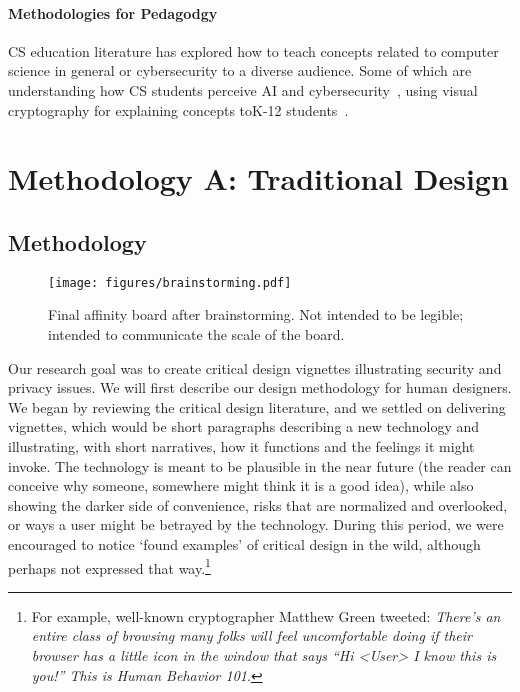 \paragraph{Methodologies for Pedagodgy} 
CS education literature has explored how to teach concepts related to computer science in general or cybersecurity to a diverse audience. Some of which are understanding how CS students perceive AI and cybersecurity~\cite{ojha_computing_2023}, using visual cryptography for explaining concepts toK-12 students~\cite{rayavaram_designing_2023}.



\section{Methodology A: Traditional Design}
\label{sec:meth1}

\subsection{Methodology}

\begin{figure}[t]
\begin{center}
\texttt{[image: figures/brainstorming.pdf]}
\caption{Final affinity board after brainstorming. Not intended to be legible; intended to communicate the scale of the board.\label{fig:board}}
\end{center}
\end{figure}


Our research goal was to create critical design vignettes illustrating security and privacy issues. We will first describe our design methodology for human designers. We began by reviewing the critical design literature, and we settled on delivering vignettes, which would be short paragraphs describing a new technology and illustrating, with short narratives, how it functions and the feelings it might invoke. The technology is meant to be plausible in the near future (the reader can conceive why someone, somewhere might think it is a good idea), while also showing the darker side of convenience, risks that are normalized and overlooked, or ways a user might be betrayed by the technology. During this period, we were encouraged to notice `found examples' of critical design in the wild, although perhaps not expressed that way.\footnote{For example, well-known cryptographer Matthew Green tweeted: \textit{There’s an entire class of browsing many folks will feel uncomfortable doing if their browser has a little icon in the window that says “Hi <User> I know this is you!” This is Human Behavior 101}.}

